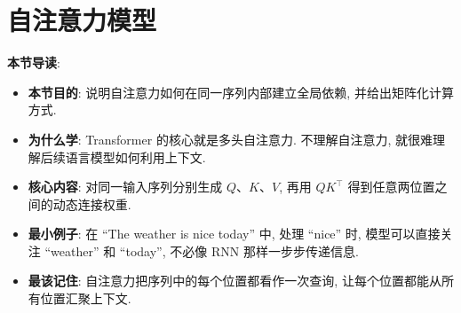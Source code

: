\documentclass{../nndlcourse}
\begin{document}
\section{自注意力模型}

\textbf{本节导读}:
\begin{itemize}
  \item \textbf{本节目的}: 说明自注意力如何在同一序列内部建立全局依赖, 并给出矩阵化计算方式.
  \item \textbf{为什么学}: Transformer 的核心就是多头自注意力. 不理解自注意力, 就很难理解后续语言模型如何利用上下文.
  \item \textbf{核心内容}: 对同一输入序列分别生成 $Q$、$K$、$V$, 再用 $QK^\top$ 得到任意两位置之间的动态连接权重.
  \item \textbf{最小例子}: 在 ``The weather is nice today'' 中, 处理 ``nice'' 时, 模型可以直接关注 ``weather'' 和 ``today'', 不必像 RNN 那样一步步传递信息.
  \item \textbf{最该记住}: 自注意力把序列中的每个位置都看作一次查询, 让每个位置都能从所有位置汇聚上下文.
\end{itemize}
\end{document}
